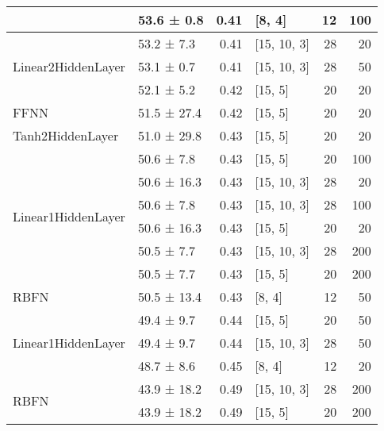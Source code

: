\begin{table*}[h]
\begin{tabular}{llrlrr}
                                            & 53.6 ± 0.8  &  0.41 & [8, 4]         &         12 &      100 \\
 \hline
\multirow{3}{*}{Linear2HiddenLayer} & 53.2 ± 7.3  &  0.41 & [15, 10, 3]    &         28 &       20 \\
                                            & 53.1 ± 0.7  &  0.41 & [15, 10, 3]    &         28 &       50 \\
                                            & 52.1 ± 5.2  &  0.42 & [15, 5]        &         20 &       20 \\
 \hline
FFNN                                & 51.5 ± 27.4 &  0.42 & [15, 5]        &         20 &       20 \\
 \hline
Tanh2HiddenLayer                    & 51.0 ± 29.8 &  0.43 & [15, 5]        &         20 &       20 \\
 \hline
\multirow{6}{*}{Linear1HiddenLayer} & 50.6 ± 7.8  &  0.43 & [15, 5]        &         20 &      100 \\
                                            & 50.6 ± 16.3 &  0.43 & [15, 10, 3]    &         28 &       20 \\
                                            & 50.6 ± 7.8  &  0.43 & [15, 10, 3]    &         28 &      100 \\
                                            & 50.6 ± 16.3 &  0.43 & [15, 5]        &         20 &       20 \\
                                            & 50.5 ± 7.7  &  0.43 & [15, 10, 3]    &         28 &      200 \\
                                            & 50.5 ± 7.7  &  0.43 & [15, 5]        &         20 &      200 \\
 \hline
RBFN                                & 50.5 ± 13.4 &  0.43 & [8, 4]         &         12 &       50 \\
 \hline
\multirow{3}{*}{Linear1HiddenLayer} & 49.4 ± 9.7  &  0.44 & [15, 5]        &         20 &       50 \\
                                            & 49.4 ± 9.7  &  0.44 & [15, 10, 3]    &         28 &       50 \\
                                            & 48.7 ± 8.6  &  0.45 & [8, 4]         &         12 &       20 \\
 \hline
\multirow{6}{*}{RBFN}               & 43.9 ± 18.2 &  0.49 & [15, 10, 3]    &         28 &      200 \\
                                            & 43.9 ± 18.2 &  0.49 & [15, 5]        &         20 &      200 \\

\end{tabular}
\end{table*}
